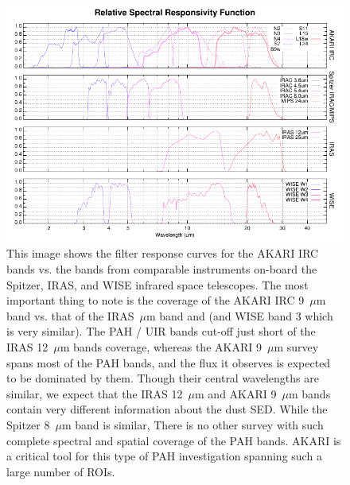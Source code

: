 \begin{figure}[htbp]
\begin{center}
\includegraphics[width=150mm]{EPS/rsr.pdf}
\caption{
This image shows the filter response curves for the AKARI IRC bands vs. the bands from comparable instruments on-board the Spitzer, IRAS, and WISE infrared space telescopes. The most important thing to note is the coverage of the AKARI IRC 9~$\mu$m band vs. that of the IRAS~$\mu$m band and (and WISE band 3 which is very similar). The PAH / UIR bands cut-off just short of the IRAS 12~$\mu$m bands coverage, whereas the AKARI 9~$\mu$m survey spans most of the PAH bands, and the flux it observes is expected to be dominated by them. Though their central wavelengths are similar, we expect that the IRAS 12~$\mu$m and AKARI 9~$\mu$m bands contain very different information about the dust SED. While the Spitzer 8~$\mu$m band is similar, There is no other survey with such complete spectral and spatial coverage of the PAH bands. AKARI is a critical tool for this type of PAH investigation spanning such a large number of ROIs.
 }
\label{rsr}
\end{center}
\end{figure}
